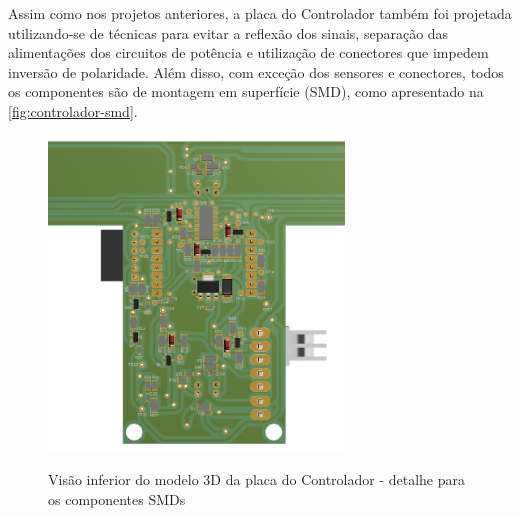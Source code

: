 Assim como nos projetos anteriores, a placa do Controlador também foi projetada utilizando-se de técnicas para evitar a reflexão dos sinais, separação das alimentações dos circuitos de potência e utilização de conectores que impedem inversão de polaridade. Além disso, com exceção dos sensores e conectores, todos os componentes são de montagem em superfície (SMD), como apresentado na \autoref{fig:controlador-smd}.

\begin{figure}[H]
    \centering
    \caption{Visão inferior do modelo 3D da placa do Controlador - detalhe para os componentes SMDs}
    \includegraphics[width=0.7\textwidth]{./dados/figuras/controlador-smd}
    \label{fig:controlador-smd}
\end{figure}





